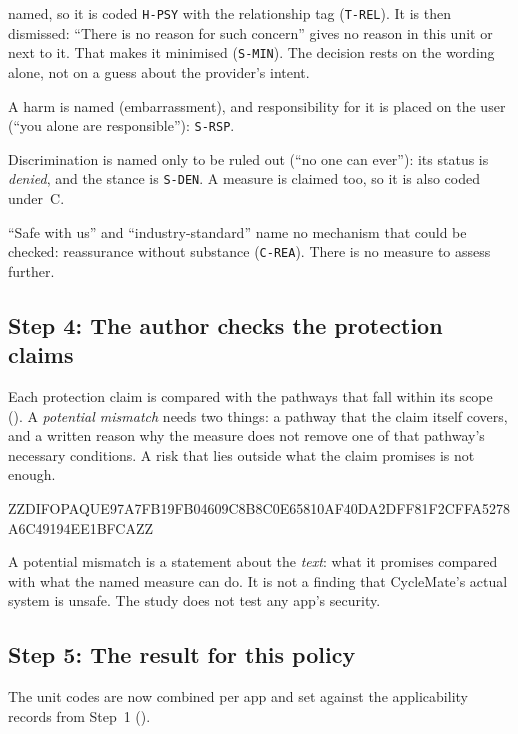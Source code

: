 \documentclass[twoside,its]{bossthesis}
\begin{document}
\begin{description}[leftmargin=0pt,itemsep=3pt]
    named, so it is coded \texttt{H-PSY} with the relationship tag
    (\texttt{T-REL}). It is then dismissed: \enquote{There is no reason for
    such concern} gives no reason in this unit or next to it. That makes it
    minimised (\texttt{S-MIN}). The decision rests on the wording alone, not
    on a guess about the provider's intent.
  \item[U8.] A harm is named (embarrassment), and responsibility for it is
    placed on the user (\enquote{you alone are responsible}): \texttt{S-RSP}.
  \item[U9.] Discrimination is named only to be ruled out (\enquote{no one can
    ever}): its status is \emph{denied}, and the stance is \texttt{S-DEN}. A
    measure is claimed too, so it is also coded under~C.
  \item[U10.] \enquote{Safe with us} and \enquote{industry-standard} name no
    mechanism that could be checked: reassurance without substance
    (\texttt{C-REA}). There is no measure to assess further.
\end{description}

\subsection*{Step 4: The author checks the protection claims}

Each protection claim is compared with the pathways that fall within its
scope (). A \emph{potential mismatch} needs two things:
a pathway that the claim itself covers, and a written reason why the measure
does not remove one of that pathway's necessary conditions. A risk that lies
outside what the claim promises is not enough.



ZZDIFOPAQUE97A7FB19FB04609C8B8C0E65810AF40DA2DFF81F2CFFA5278A6C49194EE1BFCAZZ



\noindent A potential mismatch is a statement about the \emph{text}: what it
promises compared with what the named measure can do. It is not a finding
that CycleMate's actual system is unsafe. The study does not test any app's
security.

\subsection*{Step 5: The result for this policy}

The unit codes are now combined per app and set against the applicability
records from Step~1 ().
\end{document}
